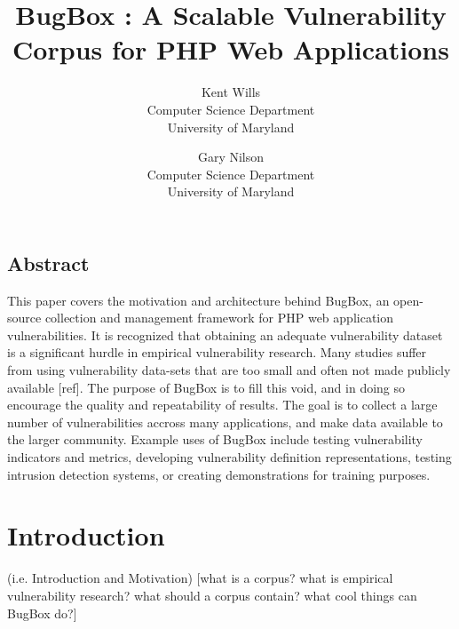 \documentclass[letterpaper,twocolumn,10pt]{article}
\begin{document}
\date{}


\title{\Large \bf BugBox : A Scalable Vulnerability Corpus for PHP Web Applications}


\author{
{\rm Kent Wills}\\
Computer Science Department\\University of Maryland
\and
{\rm Gary Nilson}\\
Computer Science Department\\University of Maryland
} %

\maketitle

\thispagestyle{empty}

\subsection*{Abstract}

This paper covers the motivation and architecture behind BugBox, an open-source collection and management framework for PHP web application vulnerabilities. It is recognized that obtaining an adequate vulnerability dataset is a significant hurdle in empirical vulnerability research. Many studies suffer from using vulnerability data-sets that are too small and often not made publicly available [ref]. The purpose of BugBox is to fill this void, and in doing so encourage the quality and repeatability of results. The goal is to collect a large number of vulnerabilities accross many applications, and make data available to the larger community. Example uses of BugBox include testing vulnerability indicators and metrics, developing vulnerability definition representations, testing intrusion detection systems, or creating demonstrations for training purposes. 

\section{Introduction}
(i.e. Introduction and Motivation)
[what is a corpus?
 what is empirical vulnerability research?
 what should a corpus contain?
 what cool things can BugBox do?]
\end{document}
